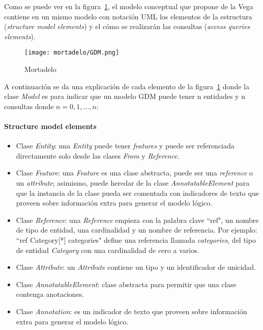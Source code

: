 Como se puede ver en la figura~\ref{img:mortadelo-gdm}, el modelo conceptual que propone de la Vega contiene en un mismo modelo con notación UML los elementos de la estructura (\textit{structure model elements}) y el cómo se realizarán las consultas (\textit{access queries elements}).


\begin{figure}[h!t] 
    \centering
    \texttt{[image: mortadelo/GDM.png]}
    \caption{Mortadelo}
    \label{img:mortadelo-gdm}
\end{figure}

A continuación se da una explicación de cada elemento de la figura~\ref{img:mortadelo-gdm} donde la clase \textit{Model} es para indicar que un modelo GDM puede tener n entidades y n consultas donde $n=0,1,...,n$:

\paragraph*{Structure model elements}


\begin{itemize}    
    
    \item Clase \textit{Entity}: una \textit{Entity} puede tener \textit{features} y puede ser referenciada directamente solo desde las clases \textit{From} y \textit{Reference}.
    \item Clase \textit{Feature}: una \textit{Feature} es una clase abstracta, puede ser una \textit{reference} o un \textit{attribute}; asimismo, puede heredar de la clase \textit{AnnotatableElement} para que la instancia de la clase pueda ser comentada con indicadores de texto que proveen sobre información extra para generar el modelo lógico. 
    \item Clase \textit{Reference}: una \textit{Reference} empieza con la palabra clave ``ref", un nombre de tipo de entidad, una cardinalidad y un nombre de referencia. Por ejemplo: ``ref Category[*] categories" define una referencia llamada \textit{categories}, del tipo de entidad \textit{Category} con una cardinalidad de cero a varios.
    \item Clase \textit{Attribute}: un \textit{Attribute} contiene un tipo y un identificador de unicidad.
    \item Clase \textit{AnnotatableElement}: clase abstracta para permitir que una clase contenga anotaciones.
    \item Clase \textit{Annotation}: es un indicador de texto que proveen sobre información extra para generar el modelo lógico.
    
\end{itemize}

